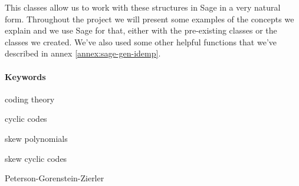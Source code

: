This classes allow us to work with these structures in Sage in a very natural form.
Throughout the project we will present some examples of the concepts we explain and we use Sage for that, either with the pre-existing classes or the classes we created.
We've also used some other helpful functions that we've described in annex \ref{annex:sage-gen-idemp}.

\paragraph{Keywords}
\begin{itemize*}[label=,itemsep=4em,itemjoin=\hspace{2em}]
  \item coding theory
  \item cyclic codes 
  \item skew polynomials
  \item skew cyclic codes
  \item Peterson-Gorenstein-Zierler
\end{itemize*}